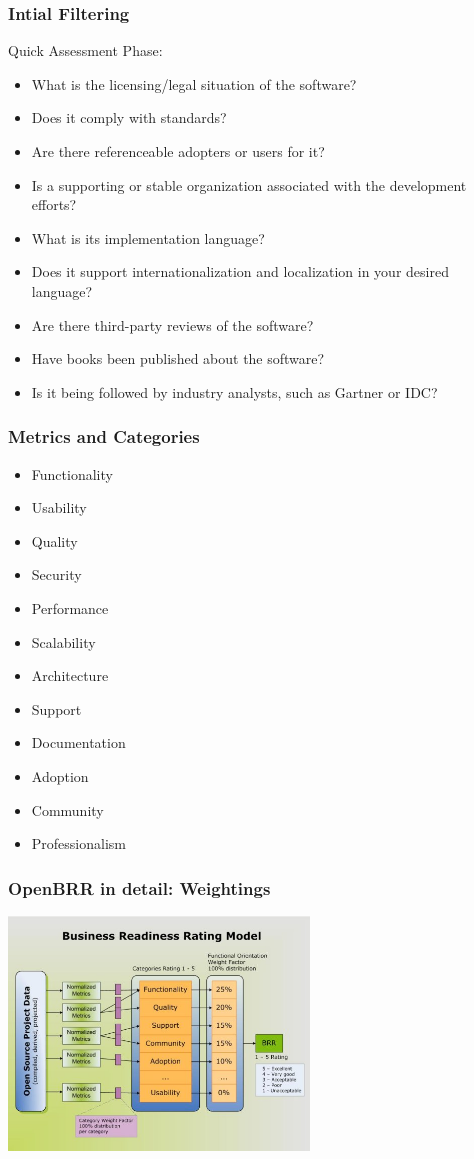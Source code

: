 \documentclass{beamer}
\begin{document}
\begin{frame}

\frametitle{Intial Filtering}

Quick Assessment Phase:

\begin{itemize}
\item  What is the licensing/legal situation of the software?
\item  Does it comply with standards?
\item  Are there referenceable adopters or users for it?
\item  Is a supporting or stable organization associated with the development efforts?
\item  What is its implementation language?
\item  Does it support internationalization and localization in your desired language?
\item  Are there third-party reviews of the software?
\item  Have books been published about the software?
\item  Is it being followed by industry analysts, such as Gartner or IDC?
\end{itemize}


\end{frame}


\begin{frame}

\frametitle{Metrics and Categories}

\begin{itemize}
\item Functionality
\item Usability
\item Quality
\item Security
\item Performance
\item Scalability
\item Architecture
\item Support
\item Documentation
\item Adoption
\item Community
\item Professionalism
\end{itemize}

\end{frame}



\begin{frame}
\frametitle{OpenBRR in detail: Weightings}

\begin{center}
\includegraphics[width=8cm]{figs/Business_Ready_Rating_Model.jpg}
\end{center}

\end{frame}


\end{document}
